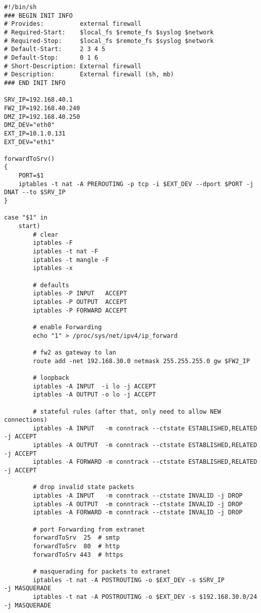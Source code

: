 \begin{lstlisting}[label=lst:masq,caption={Masquerading.}]
#!/bin/sh
### BEGIN INIT INFO
# Provides:          external firewall
# Required-Start:    $local_fs $remote_fs $syslog $network
# Required-Stop:     $local_fs $remote_fs $syslog $network
# Default-Start:     2 3 4 5
# Default-Stop:      0 1 6
# Short-Description: External firewall
# Description:       External firewall (sh, mb)
### END INIT INFO

SRV_IP=192.168.40.1
FW2_IP=192.168.40.240
DMZ_IP=192.168.40.250
DMZ_DEV="eth0"
EXT_IP=10.1.0.131
EXT_DEV="eth1"

forwardToSrv()
{
    PORT=$1
    iptables -t nat -A PREROUTING -p tcp -i $EXT_DEV --dport $PORT -j DNAT --to $SRV_IP
}

case "$1" in
    start)
        # clear
        iptables -F
        iptables -t nat -F
        iptables -t mangle -F
        iptables -x

        # defaults
        iptables -P INPUT   ACCEPT
        iptables -P OUTPUT  ACCEPT
        iptables -P FORWARD ACCEPT

        # enable Forwarding
        echo "1" > /proc/sys/net/ipv4/ip_forward

        # fw2 as gateway to lan
        route add -net 192.168.30.0 netmask 255.255.255.0 gw $FW2_IP

        # loopback
        iptables -A INPUT  -i lo -j ACCEPT
        iptables -A OUTPUT -o lo -j ACCEPT

        # stateful rules (after that, only need to allow NEW connections)
        iptables -A INPUT   -m conntrack --ctstate ESTABLISHED,RELATED -j ACCEPT
        iptables -A OUTPUT  -m conntrack --ctstate ESTABLISHED,RELATED -j ACCEPT
        iptables -A FORWARD -m conntrack --ctstate ESTABLISHED,RELATED -j ACCEPT

        # drop invalid state packets
        iptables -A INPUT   -m conntrack --ctstate INVALID -j DROP
        iptables -A OUTPUT  -m conntrack --ctstate INVALID -j DROP
        iptables -A FORWARD -m conntrack --ctstate INVALID -j DROP

        # port Forwarding from extranet
        forwardToSrv  25  # smtp
        forwardToSrv  80  # http
        forwardToSrv 443  # https

        # masquerading for packets to extranet
        iptables -t nat -A POSTROUTING -o $EXT_DEV -s $SRV_IP          -j MASQUERADE
        iptables -t nat -A POSTROUTING -o $EXT_DEV -s $192.168.30.0/24 -j MASQUERADE


\end{lstlisting}

